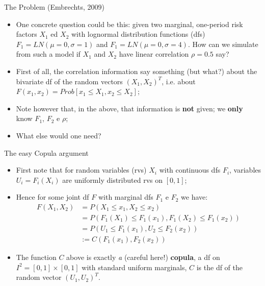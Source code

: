 \documentclass[11pt]{beamer}
\theoremstyle{plain}
\theoremstyle{definition}
\theoremstyle{remark}
\begin{document}
\begin{frame}{The Problem (Embrechts, 2009)}
   \begin{itemize}
      \item  One concrete question could be this: given two marginal, one-period risk factors $X_1$ ed $X_2$ with lognormal distribution 
      functions (dfs) 
       $F_1 = LN(\mu=0, \sigma=1)$ and  $F_1 = LN(\mu=0, \sigma=4)$. How can we simulate from such a model if $X_1$ and $X_2$ 
       have linear correlation $\rho = 0.5$ say?
	  \item First of all, the correlation information say something (but what?) about the bivariate df of the random vectors $(X_1, X_2)^T$, 
	  i.e. about
	    $F(x_1, x_2) = Prob[x_1 \le X_1, x_2 \le X_2]$;
	  \item Note however that, in the above, that information is \textbf{not} given; we \textbf{only} know $F_1$, $F_2$ e $\rho$; 
	  \item What else would one need?
   \end{itemize}
\end{frame}
%
\begin{frame}{The easy Copula argument}
   \begin{itemize}
	    \item First note that for random variables (rvs) $X_i$ with continuous dfs $F_i$, variables $U_i= F_i(X_i) $ are uniformly distributed 
	    rvs on $[0, 1]$;
		\item Hence for some joint df $F$ with marginal dfs $F_1$ e $F_2$ we have:
		\begin{equation}
			\begin{split}
			F(X_1, X_2) &= P(X_1 \le x_1, X_2 \le x_2) \\
			&= P(F_1(X_1) \le F_1(x_1), F_1(X_2) \le F_1(x_2)) \\
			&= P(U_1 \le F_1(x_1), U_2 \le F_2(x_2)) \\
			& := C(F_1(x_1), F_2(x_2)) 
			\end{split}
		\end{equation}	  
		\item The function $C$ above is exactly \textit{a} (careful here!) \textbf{copula}, a df on $I^2 = [0, 1] \times [0, 1]$ with standard 
		uniform marginals, $C$ is the df of the random vector $(U_1, U_2)^T$.  
   \end{itemize}
\end{frame}
\end{document}
